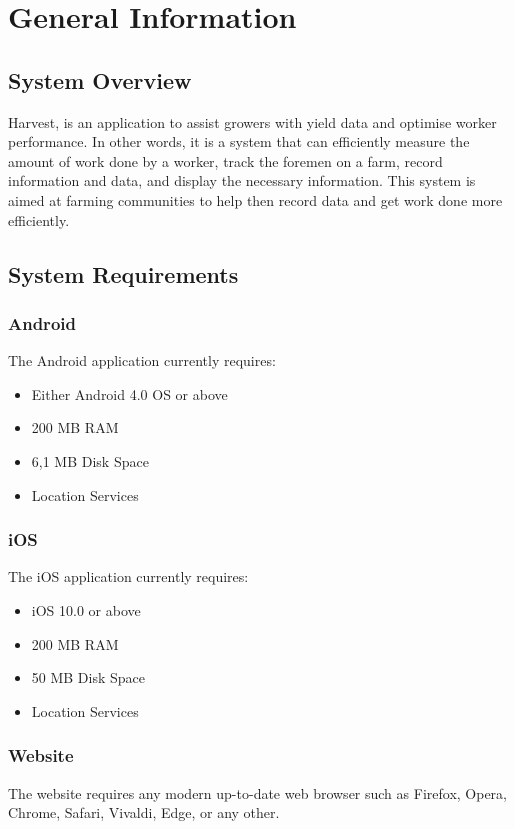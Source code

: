 \documentclass[11pt]{article}
\begin{document}
\newpage
{}
\tableofcontents
\newpage
\listoffigures

\newpage
{}

\section{General Information}
\subsection{System Overview}
Harvest, is an application to assist growers with yield data and optimise worker performance. In other words, it is a system that can efficiently measure the amount of work done by a worker, track the foremen on a farm, record information and data, and display the necessary information. This system is aimed at farming communities to help then record data and get work done more efficiently.

\subsection{System Requirements}
\subsubsection{Android}
The Android application currently requires:
\begin{itemize}
	\item Either Android 4.0 OS or above
\item 200 MB RAM
\item 6,1 MB Disk Space	
	\item Location Services
\end{itemize}
\subsubsection{iOS}
The iOS application currently requires:
\begin{itemize}
	\item iOS 10.0 or above
\item 200 MB RAM
\item 50 MB Disk Space	
	\item Location Services
\end{itemize}
\subsubsection{Website}
The website requires any modern up-to-date web browser such as Firefox, Opera, Chrome, Safari, Vivaldi, Edge, or any other.
\end{document}
